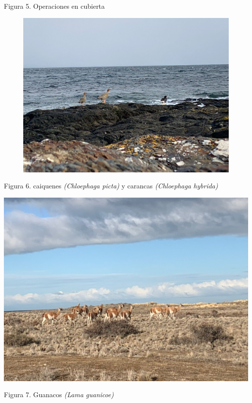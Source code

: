 \documentclass[
  letterpaper,
  DIV=11,
  numbers=noendperiod]{scrartcl}
\begin{document}
Figura 5. Operaciones en cubierta

\begin{figure}

{\centering \includegraphics{WhatsApp Image 2023-09-06 at 12.41.02.jpeg}

}

\end{figure}

Figura 6. caiquenes \emph{(Chloephaga picta)} y carancas
\emph{(Chloephaga hybrida)}

\includegraphics{WhatsApp Image 2023-09-06 at 13.06.09.jpeg}

Figura 7. Guanacos \emph{(Lama guanicoe)}
\end{document}
